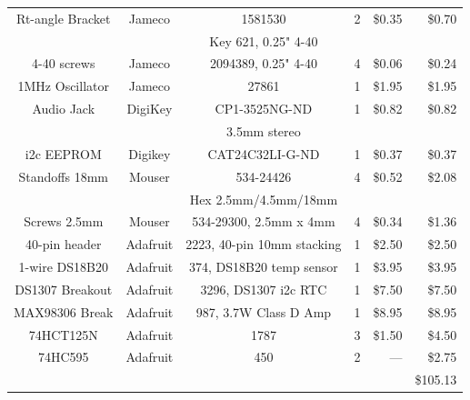 \documentclass[11pt]{article}
\begin{document}
\begin{table}[thp]
\begin{tabular}{|c|c|c|c|r|r|}
\hline
Rt-angle Bracket& Jameco	& 1581530		  & 2	&  \$0.35  &  \$0.70 \\
		&		& Key 621, 0.25" 4-40	  &	&          &         \\
\hline
4-40 screws	& Jameco	& 2094389, 0.25" 4-40	  & 4	&  \$0.06  &  \$0.24 \\
\hline
1MHz Oscillator	& Jameco	& 27861			  & 1	& \$1.95   &  \$1.95 \\
\hline
Audio Jack	& DigiKey	& CP1-3525NG-ND	          & 1	&  \$0.82  &  \$0.82 \\
		&		& 3.5mm stereo		  &	&	   &	     \\
\hline
i2c EEPROM	& Digikey 	& CAT24C32LI-G-ND         & 1 	& \$0.37   &  \$0.37 \\
\hline
Standoffs 18mm	& Mouser	& 534-24426		  & 4   &  \$0.52  &  \$2.08 \\
		&		& Hex 2.5mm/4.5mm/18mm	  &	&	   &	     \\
\hline
Screws 2.5mm	& Mouser	& 534-29300, 2.5mm x 4mm  & 4   &  \$0.34  &  \$1.36 \\
\hline
40-pin header	& Adafruit	& 2223, 40-pin 10mm stacking & 1	&  \$2.50  &  \$2.50 \\
\hline
1-wire DS18B20	& Adafruit	& 374, DS18B20 temp sensor& 1	&  \$3.95  &  \$3.95 \\
\hline
DS1307 Breakout	& Adafruit	& 3296, DS1307 i2c RTC	  & 1	&  \$7.50  &  \$7.50 \\
\hline
MAX98306 Break	& Adafruit	& 987, 3.7W Class D Amp   & 1	&  \$8.95  &  \$8.95 \\
\hline
74HCT125N	& Adafruit	& 1787			  & 3	&  \$1.50  &  \$4.50 \\
\hline
74HC595		& Adafruit	& 450			  & 2	&  ---     &  \$2.75 \\
\hline
\hline
		&		&		&	&		& \$105.13 \\
\hline
\end{tabular}
\end{table}
\end{document}
